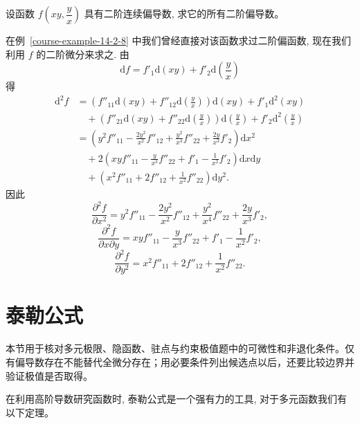 \documentclass[UTF8,12pt,a4paper,fontset=fandol]{ctexart}
\begin{document}
\begin{example}\label{course-example-14-2-10}\quad 设函数 $f\left(xy,\dfrac yx\right)$ 具有二阶连续偏导数, 求它的所有二阶偏导数。

\end{example}
\begin{solve}\quad 在例~\ref{course-example-14-2-8}  中我们曾经直接对该函数求过二阶偏函数, 现在我们利用 $f$ 的二阶微分来求之. 由
\[
  \mathrm df=f'_1\mathrm d(xy)+f'_2\mathrm d\left(\frac yx\right)
\]
得
\[
\begin{aligned}
  \mathrm d^2f
  &=\left(f''_{11}\mathrm d(xy)+f''_{12}\mathrm d\left(\frac yx\right)\right)\mathrm d(xy)
  +f'_1\mathrm d^2(xy)\\
  &\quad+\left(f''_{21}\mathrm d(xy)+f''_{22}\mathrm d\left(\frac yx\right)\right)
  \mathrm d\left(\frac yx\right)+f'_2\mathrm d^2\left(\frac yx\right)\\
  &=\left(y^2f''_{11}-\frac{2y^2}{x^2}f''_{12}
  +\frac{y^2}{x^4}f''_{22}+\frac{2y}{x^3}f'_2\right)\mathrm dx^2\\
  &\quad+2\left(xyf''_{11}-\frac y{x^3}f''_{22}
  +f'_1-\frac1{x^2}f'_2\right)\mathrm dx\mathrm dy\\
  &\quad+\left(x^2f''_{11}+2f''_{12}+\frac1{x^2}f''_{22}\right)\mathrm dy^2.
\end{aligned}
\]
因此
\[
  \frac{\partial^2 f}{\partial x^2}
  =y^2f''_{11}-\frac{2y^2}{x^2}f''_{12}
  +\frac{y^2}{x^4}f''_{22}+\frac{2y}{x^3}f'_2,
\]
\[
  \frac{\partial^2 f}{\partial x\partial y}
  =xyf''_{11}-\frac y{x^3}f''_{22}
  +f'_1-\frac1{x^2}f'_2,
\]
\[
  \frac{\partial^2 f}{\partial y^2}
  =x^2f''_{11}+2f''_{12}+\frac1{x^2}f''_{22}.
\]

\end{solve}


\section{泰勒公式}\label{course-14-3}
本节用于核对多元极限、隐函数、驻点与约束极值题中的可微性和非退化条件。仅有偏导数存在不能替代全微分存在；用必要条件列出候选点以后，还要比较边界并验证极值是否取得。

在利用高阶导数研究函数时, 泰勒公式是一个强有力的工具, 对于多元函数我们有以下定理。
\end{document}
